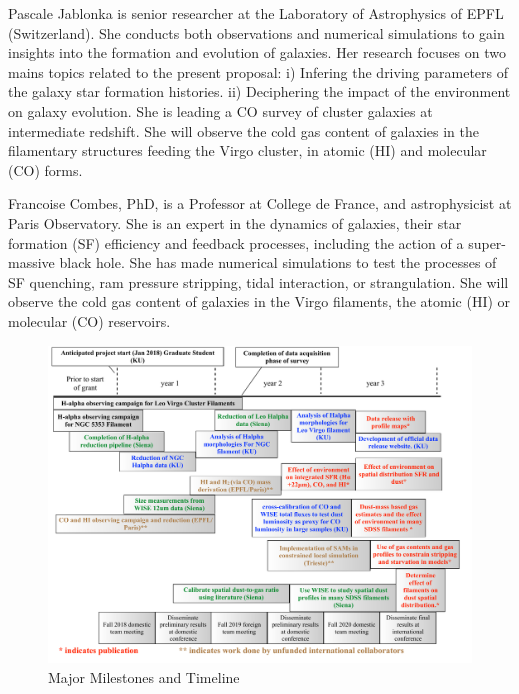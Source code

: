 \documentclass[11pt, preprint]{aastex}
\begin{document}
{Pascale Jablonka is senior researcher at the Laboratory of
Astrophysics of EPFL (Switzerland). She conducts both observations and
numerical simulations to gain insights into the formation and
evolution of galaxies. Her research focuses on two mains
topics related to the present proposal: i) Infering the driving
parameters of the galaxy star formation histories. ii) Deciphering the
impact of the environment on galaxy evolution. She is leading a CO
survey of cluster galaxies at intermediate redshift. She will observe
the cold gas content of galaxies in the filamentary structures feeding
the Virgo cluster, in atomic (HI) and molecular (CO) forms.


Francoise Combes, PhD, is a Professor at College de France, and astrophysicist at Paris Observatory. She is an expert in the dynamics of galaxies, their star formation (SF) efficiency and feedback processes, including the action of a super-massive black hole. She has made numerical simulations to test the processes of SF quenching, ram pressure stripping, tidal interaction, or strangulation. She will observe the cold gas content of galaxies in the Virgo filaments, the atomic (HI) or molecular (CO) reservoirs.




%
%


\begin{figure}[h]
\caption{Major Milestones and Timeline \label{schedule}}
\includegraphics[width=\textwidth]{work-plan_v2.pdf}
\end{figure}

}
\end{document}
